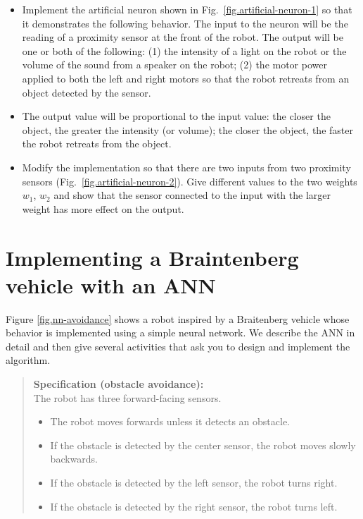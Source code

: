 \begin{framed}
\begin{itemize}
\item Implement the artificial neuron shown in Fig.~\ref{fig.artificial-neuron-1} so that it demonstrates the following behavior. The input to the neuron will be the reading of a proximity sensor at the front of the robot. The output will be one or both of the following: (1) the intensity of a light on the robot or the volume of the sound from a speaker on the robot; (2) the motor power applied to both the left and right motors so that the robot retreats from an object detected by the sensor.
\item The output value will be proportional to the input value: the closer the object, the greater the intensity (or volume); the closer the object, the faster the robot retreats from the object.
\item Modify the implementation so that there are two inputs from two proximity sensors (Fig.~\ref{fig.artificial-neuron-2}). Give different values to the two weights $w_1$, $w_2$ and show that the sensor connected to the input with the larger weight has more effect on the output.
\end{itemize}
\end{framed}


\section{Implementing a Braintenberg vehicle with an ANN}\label{s.braitenberg-ann}

Figure \ref{fig.nn-avoidance} shows a robot inspired by a Braitenberg vehicle whose behavior is implemented using a simple neural network. We describe the ANN in detail and then give several activities that ask you to design and implement the algorithm.

\begin{quote}
\normalsize
\noindent\textbf{Specification (obstacle avoidance):}\\
The robot has three forward-facing sensors.
\begin{itemize}
\item The robot moves forwards unless it detects an obstacle.
\item If the obstacle is detected by the center sensor, the robot moves slowly backwards.
\item If the obstacle is detected by the left sensor, the robot turns right.
\item If the obstacle is detected by the right sensor, the robot turns left.
\end{itemize}
\end{quote}

